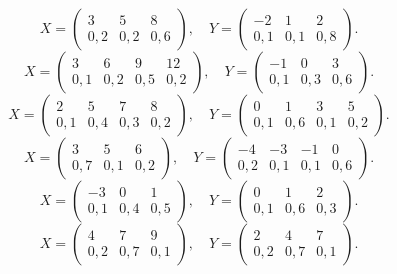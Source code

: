 $$ X = \left(\begin{array}{*{3}{c}} 3 & 5 & 8 \\ 0{,}2 & 0{,}2 & 0{,}6 \end{array}\right), \quad Y = \left(\begin{array}{*{3}{c}} -2 & 1 & 2 \\ 0{,}1 & 0{,}1 & 0{,}8 \end{array}\right). $$
$$ X = \left(\begin{array}{*{4}{c}} 3 & 6 & 9 & 12 \\ 0{,}1 & 0{,}2 & 0{,}5 & 0{,}2 \end{array}\right), \quad Y = \left(\begin{array}{*{3}{c}} -1 & 0 & 3 \\ 0{,}1 & 0{,}3 & 0{,}6 \end{array}\right). $$
$$ X = \left(\begin{array}{*{4}{c}} 2 & 5 & 7 & 8 \\ 0{,}1 & 0{,}4 & 0{,}3 & 0{,}2 \end{array}\right), \quad Y = \left(\begin{array}{*{4}{c}} 0 & 1 & 3 & 5 \\ 0{,}1 & 0{,}6 & 0{,}1 & 0{,}2 \end{array}\right). $$
$$ X = \left(\begin{array}{*{3}{c}} 3 & 5 & 6 \\ 0{,}7 & 0{,}1 & 0{,}2 \end{array}\right), \quad Y = \left(\begin{array}{*{4}{c}} -4 & -3 & -1 & 0 \\ 0{,}2 & 0{,}1 & 0{,}1 & 0{,}6 \end{array}\right). $$
$$ X = \left(\begin{array}{*{3}{c}} -3 & 0 & 1 \\ 0{,}1 & 0{,}4 & 0{,}5 \end{array}\right), \quad Y = \left(\begin{array}{*{3}{c}} 0 & 1 & 2 \\ 0{,}1 & 0{,}6 & 0{,}3 \end{array}\right). $$
$$ X = \left(\begin{array}{*{3}{c}} 4 & 7 & 9 \\ 0{,}2 & 0{,}7 & 0{,}1 \end{array}\right), \quad Y = \left(\begin{array}{*{3}{c}} 2 & 4 & 7 \\ 0{,}2 & 0{,}7 & 0{,}1 \end{array}\right). $$
